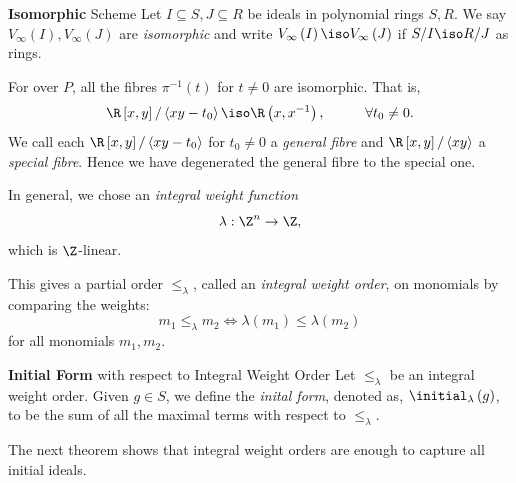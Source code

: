 \documentclass[co439]{subfiles}
\begin{document}
    \rruleline
    
    \begin{definition}{\textbf{Isomorphic} Scheme}
        Let $I\subseteq S, J\subseteq R$ be ideals in polynomial rings $S,R$. We say $V_{\infty}\left( I \right),V_{\infty}\left( J \right)$ are \emph{isomorphic} and write $V_{\infty}\left( I \right)\iso V_{\infty}\left( J \right)$ if $S /I\iso R /J$ as rings.
    \end{definition}

    \begin{example}{}
        For over $P$, all the fibres $\pi^{-1}\left( t \right)$ for $t\neq 0$ are isomorphic. That is,
        \begin{equation*}
            \R\left[ x,y \right] / \left< xy-t_0 \right> \iso \R\left( x,x^{-1} \right) , \hspace{1cm}\forall t_0\neq 0.
        \end{equation*}
        We call each $\R\left[ x,y \right] / \left< xy-t_0 \right>$ for $t_0\neq 0$ a \textit{general fibre} and $\R\left[ x,y \right] / \left< xy \right>$ a \textit{special fibre}. Hence we have degenerated the general fibre to the special one.  
    \end{example}

    \rruleline
    
    \np In general, we chose an \emph{integral weight function}
    \begin{equation*}
        \lambda:\Z^n\to\Z,
    \end{equation*}
    which is $\Z$-linear.

    This gives a partial order $\leq_{\lambda}$, called an \emph{integral weight order}, on monomials by comparing the weights:
    \begin{equation*}
        m_1 \leq_{\lambda} m_2 \iff \lambda\left( m_1 \right)\leq\lambda\left( m_2 \right)
    \end{equation*}
    for all monomials $m_1,m_2$.

    \begin{definition}{\textbf{Initial Form} with respect to Integral Weight Order}
        Let $\leq_{\lambda}$ be an integral weight order. Given $g\in S$, we define the \emph{inital form}, denoted as, $\initial_{\lambda}\left( g \right)$, to be the sum of all the maximal terms with respect to $\leq_{\lambda}$.
    \end{definition}

    \np The next theorem shows that integral weight orders are enough to capture all initial ideals.
    
\end{document}
